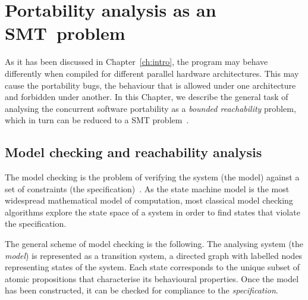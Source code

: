 \chapter{Portability analysis as an SMT~problem}
\label{ch:port}







As it has been discussed in Chapter~\ref{ch:intro}, the program may behave differently when compiled for different parallel hardware architectures.
This may cause the portability bugs, the behaviour that is allowed under one architecture and forbidden under another. 
In this Chapter, we describe the general task of analysing the concurrent software portability
as a \textit{bounded reachability} problem, which in turn can be reduced to a SMT problem~\cite{Porthos17a}.


\section{Model checking and reachability analysis}
\label{ch:port:mc}

The model checking is the problem of verifying the system (the model) against a set of constraints (the specification)~\cite{dkw2008}.
As the state machine model is the most widespread mathematical model of computation, most classical model checking algorithms explore the state space of a system in order to find states that violate the specification.

The general scheme of model checking is the following. 
The analysing system (the \textit{model}) is represented as a transition system, a directed graph with labelled nodes representing states of the system.
Each state corresponds to the unique subset of atomic propositions that characterise its behavioural properties.
Once the model has been constructed, it can be checked for compliance to the \textit{specification}.

